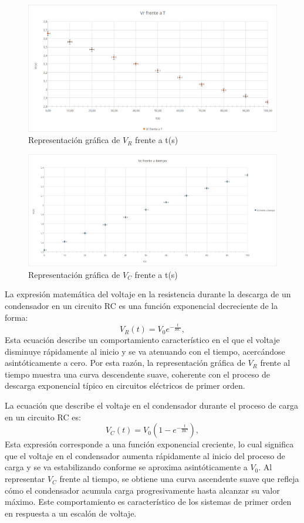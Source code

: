 \documentclass{article}
\begin{document}
 \begin{figure}[H]
 	\centering
 	\includegraphics[width=1\linewidth]{images/graficaVr.png}
	\vspace{0.3em}
	\small{Representación gráfica de $V_R$ frente a t(s)}
 \end{figure}
\begin{figure}[H]
	\centering
	\includegraphics[width=1\linewidth]{images/graficaVc.png}
	\vspace{0.3em}
\small{Representación gráfica de $V_C$ frente a t(s)}
\end{figure}
\noindent
La expresión matemática del voltaje en la resistencia durante la descarga de un condensador en un circuito RC es una función exponencial decreciente de la forma:
\[
V_R(t) = V_0 e^{-\frac{t}{RC}},
\]
Esta ecuación describe un comportamiento característico en el que el voltaje disminuye rápidamente al inicio y se va atenuando con el tiempo, acercándose asintóticamente a cero. Por esta razón, la representación gráfica de \( V_R \) frente al tiempo muestra una curva descendente suave, coherente con el proceso de descarga exponencial típico en circuitos eléctricos de primer orden.

\vspace{2em}
\noindent
La ecuación que describe el voltaje en el condensador durante el proceso de carga en un circuito RC es:
\[
V_C(t) = V_0 \left(1 - e^{-\frac{t}{RC}}\right),
\]
Esta expresión corresponde a una función exponencial creciente, lo cual significa que el voltaje en el condensador aumenta rápidamente al inicio del proceso de carga y se va estabilizando conforme se aproxima asintóticamente a \( V_0 \). Al representar \( V_C \) frente al tiempo, se obtiene una curva ascendente suave que refleja cómo el condensador acumula carga progresivamente hasta alcanzar su valor máximo. Este comportamiento es característico de los sistemas de primer orden en respuesta a un escalón de voltaje.
\end{document}
